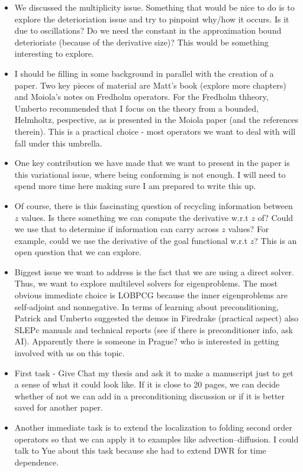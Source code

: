 \documentclass[12pt,a4paper]{article}
\begin{document}
\begin{itemize}
    \item We discussed the multiplicity issue. Something that would be nice to do is to explore the deterioriation issue and try to pinpoint why/how it occurs. Is it due to oscillations? Do we need the constant in the approximation bound deterioriate (because of the derivative size)? This would be something interesting to explore.
    \item I should be filling in some background in parallel with the creation of a paper. Two key pieces of material are Matt's book (explore more chapters) and Moiola's notes on Fredholm operators. For the Fredholm thheory, Umberto recommended that I focus on the theory from a bounded, Helmholtz, pespective, as is presented in the Moiola paper (and the references therein). This is a practical choice - most operators we want to deal with will fall under this umbrella.
    \item One key contribution we have made that we want to present in the paper is this variational issue, where being conforming is not enough. I will need to spend more time here making sure I am prepared to write this up. 
    \item Of course, there is this fascinating question of recycling information between $z$ values. Is there something we can compute the derivative w.r.t $z$ of? Could we use that to determine if information can carry across $z$ values? For example, could we use the derivative of the goal functional w.r.t $z$? This is an open question that we can explore. 
    \item Biggest issue we want to address is the fact that we are using a direct solver. Thus, we want to explore multilevel solvers for eigenproblems. The most obvious immediate choice is LOBPCG because the inner eigenproblems are self-adjoint and nonnegative. In terms of learning about preconditioning, Patrick and Umberto suggested the demos in Firedrake (practical aspect) also SLEPc manuals and technical reports (see if there is preconditioner info, ask AI). Apparently there is someone in Prague? who is interested in getting involved with us on this topic.
    \item First task - Give Chat my thesis and ask it to make a manuscript just to get a sense of what it could look like. If it is close to 20 pages, we can decide whether of not we can add in a preconditioning discussion or if it is better saved for another paper. 
    \item Another immediate task is to extend the localization to folding second order operators so that we can apply it to examples like advection--diffusion. I could talk to Yue about this task because she had to extend DWR for time dependence. 

\end{itemize}
\end{document}
